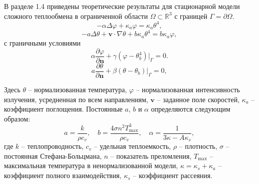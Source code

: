 В разделе 1.4 приведены теоретические результаты для
стационарной модели сложного теплообмена
в ограниченной области $\Omega \subset \mathbb{R}^3$ с границей $\Gamma=\partial \Omega$.
\begin{equation}
    \label{eq:1_4:4-2}
    - \alpha \Delta \varphi + \kappa_a \varphi = \kappa_a \theta^4,
\end{equation}
\begin{equation}
    \label{eq:1_4:4-1}
    -a \Delta \theta + \textbf{v} \cdot \nabla \theta
    + b \kappa_a \theta^4 =  b \kappa_a \varphi,
\end{equation}
с граничными условиями
\begin{equation}
    \label{eq:1_4:4-4}
    \alpha \frac{\partial \varphi}{\partial \mathbf{n}} + \gamma
    (\varphi-\theta_b^4)|_{\Gamma} = 0.
\end{equation}
\begin{equation}
    \label{eq:1_4:4-3}
    a \frac{\partial \theta}{\partial \mathbf{n}}
    +\left.\beta\left(\theta-\theta_{b}\right)\right|_{\Gamma}=0,
\end{equation}


Здесь $\theta$ -- нормализованная температура, $\varphi$ --
нормализованная интенсивность излучения, усредненная по всем
направлениям, $\textbf{v}$ -- заданное поле скоростей, $\kappa_a$ --
коэффициент поглощения.
Постоянные $a$, $b$ и $\alpha$
определяются следующим образом:
\[
    a=\frac{k}{\rho c_v},\quad b = \frac{4\sigma n^2 T_{\max}^3}{\rho c_v},
    \quad \alpha=\frac{1}{3\kappa - A \kappa_s},
\]
где $k$ -- теплопроводность, $c_v$ -- удельная теплоемкость, $\rho$ --
плотность, $\sigma$ -- постоянная Стефана-Больцмана, $n$ --
показатель преломления, $T_{\max}$ -- максимальная температура в
ненормализованной модели, $\kappa = \kappa_s + \kappa_a$ -- коэффициент
полного взаимодействия, $\kappa_s$ -- коэффициент рассеяния.



